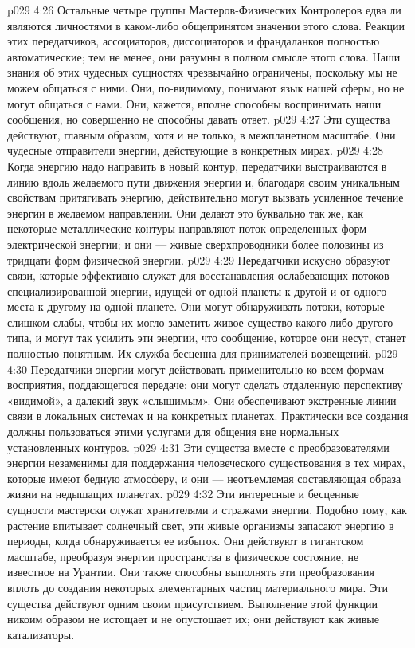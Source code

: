 \vs p029 4:26 \pc Остальные четыре группы Мастеров\hyp{}Физических Контролеров едва ли являются личностями в каком\hyp{}либо общепринятом значении этого слова. Реакции этих передатчиков, ассоциаторов, диссоциаторов и франдаланков полностью автоматические; тем не менее, они разумны в полном смысле этого слова. Наши знания об этих чудесных сущностях чрезвычайно ограничены, поскольку мы не можем общаться с ними. Они, по\hyp{}видимому, понимают язык нашей сферы, но не могут общаться с нами. Они, кажется, вполне способны воспринимать наши сообщения, но совершенно не способны давать ответ.
\vs p029 4:27 \pc {}\bibnobreakspace {} Эти существа действуют, главным образом, хотя и не только, в межпланетном масштабе. Они чудесные отправители энергии, действующие в конкретных мирах.
\vs p029 4:28 Когда энергию надо направить в новый контур, передатчики выстраиваются в линию вдоль желаемого пути движения энергии и, благодаря своим уникальным свойствам притягивать энергию, действительно могут вызвать усиленное течение энергии в желаемом направлении. Они делают это буквально так же, как некоторые металлические контуры направляют поток определенных форм электрической энергии; и они --- живые сверхпроводники более половины из тридцати форм физической энергии.
\vs p029 4:29 Передатчики искусно образуют связи, которые эффективно служат для восстанавления ослабевающих потоков специализированной энергии, идущей от одной планеты к другой и от одного места к другому на одной планете. Они могут обнаруживать потоки, которые слишком слабы, чтобы их могло заметить живое существо какого\hyp{}либо другого типа, и могут так усилить эти энергии, что сообщение, которое они несут, станет полностью понятным. Их служба бесценна для принимателей возвещений.
\vs p029 4:30 Передатчики энергии могут действовать применительно ко всем формам восприятия, поддающегося передаче; они могут сделать отдаленную перспективу «видимой», а далекий звук «слышимым». Они обеспечивают экстренные линии связи в локальных системах и на конкретных планетах. Практически все создания должны пользоваться этими услугами для общения вне нормальных установленных контуров.
\vs p029 4:31 Эти существа вместе с преобразователями энергии незаменимы для поддержания человеческого существования в тех мирах, которые имеют бедную атмосферу, и они --- неотъемлемая составляющая образа жизни на недышащих планетах.
\vs p029 4:32 \pc {}\bibnobreakspace {} Эти интересные и бесценные сущности мастерски служат хранителями и стражами энергии. Подобно тому, как растение впитывает солнечный свет, эти живые организмы запасают энергию в периоды, когда обнаруживается ее избыток. Они действуют в гигантском масштабе, преобразуя энергии пространства в физическое состояние, не известное на Урантии. Они также способны выполнять эти преобразования вплоть до создания некоторых элементарных частиц материального мира. Эти существа действуют одним своим присутствием. Выполнение этой функции никоим образом не истощает и не опустошает их; они действуют как живые катализаторы.
